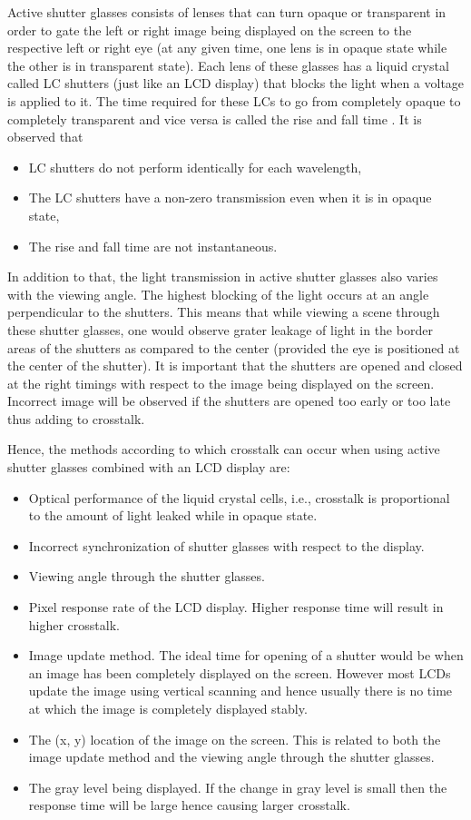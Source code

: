 Active shutter glasses consists of lenses that can turn opaque or transparent in order to gate the left or right image being displayed on the screen to the respective left or right eye (at any given time, one lens is in opaque state while the other is in transparent state). Each lens of these glasses has a liquid crystal called LC shutters (just like an LCD display) that blocks the light when a voltage is applied to it. The time required for these LCs to go from completely opaque to completely transparent and vice versa is called the rise and fall time \cite{woods2012crosstalk}. It is observed that

\begin{itemize}
\item{LC shutters do not perform identically for each wavelength,}
\item{The LC shutters have a non-zero transmission even when it is in opaque state,}
\item{The rise and fall time are not instantaneous.}
\end{itemize}

In addition to that, the light transmission in active shutter glasses also varies with the viewing angle. The highest blocking of the light occurs at an angle perpendicular to the shutters. This means that while viewing a scene through these shutter glasses, one would observe grater leakage of light in the border areas of the shutters as compared to the center (provided the eye is positioned at the center of the shutter). It is important that the shutters are opened and closed at the right timings with respect to the image being displayed on the screen. Incorrect image will be observed if the shutters are opened too early or too late thus adding to crosstalk.

Hence, the methods according to which crosstalk can occur when using active shutter glasses combined with an LCD display are:
\begin{itemize}
	\item{Optical performance of the liquid crystal cells, i.e., crosstalk is proportional to the amount of light leaked while in opaque state.}
	\item{Incorrect synchronization of shutter glasses with respect to the display.}
	\item{Viewing angle through the shutter glasses.}
	\item{Pixel response rate of the LCD display. Higher response time will result in higher crosstalk.}
	\item{Image update method. The ideal time for opening of a shutter would be when an image has been completely displayed on the screen. However most LCDs update the image using vertical scanning and hence usually there is no time at which the image is completely displayed stably.}
	\item{The (x, y) location of the image on the screen. This is related to both the image update method and the viewing angle through the shutter glasses.}
	\item{The gray level being displayed. If the change in gray level is small then the response time will be large hence causing larger crosstalk. }
\end{itemize}

